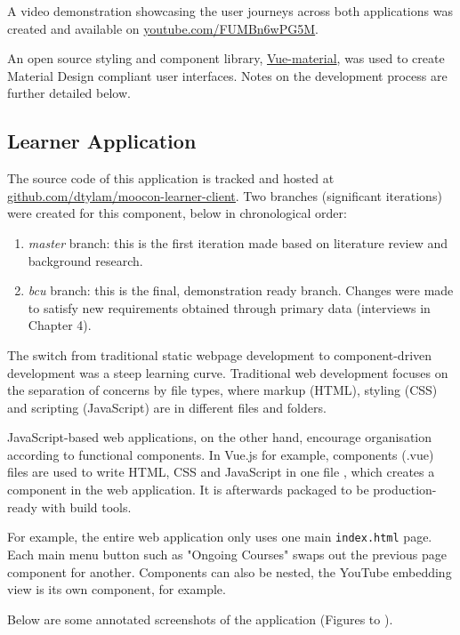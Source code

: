 A video demonstration showcasing the user journeys across both applications was created and 
available on \href{https://youtu.be/FUMBn6wPG5M}{\underline{youtube.com/FUMBn6wPG5M}}.

An open source styling and component library, \href{https://vuematerial.io/}{Vue-material}, was used to 
create Material Design compliant user interfaces. Notes on the development process are further detailed below.

\subsection{Learner Application}

The source code of this application is tracked and hosted at 
\href{https://github.com/dtylam/moocon-learner-client}{\underline{github.com/dtylam/moocon-learner-client}}.
Two branches (significant iterations) were created for this component, below in chronological order:
\begin{enumerate}
	\setlength\itemsep{0em}
	\item \textit{master} branch: this is the first iteration made based on literature review and background research.
	\item \textit{bcu} branch: this is the final, demonstration ready branch. 
	Changes were made to satisfy new requirements obtained through primary data (interviews in Chapter 4).
\end{enumerate}

The switch from traditional static webpage development to component-driven development was a steep learning curve.
Traditional web development focuses on the separation of concerns by file types, where markup (HTML), 
styling (CSS) and scripting (JavaScript) are in different files and folders.

JavaScript-based web applications, on the other hand, encourage organisation according to functional components. 
In Vue.js for example, components (.vue) files are used to write HTML, CSS and JavaScript in one file \citep{vue2017components}, 
which creates a component in the web application. It is afterwards packaged to be production-ready with build tools.

For example, the entire web application only uses one main \texttt{index.html} page. Each main menu button 
such as "Ongoing Courses" swaps out the previous page component for another. Components can also be nested, 
the YouTube embedding view is its own component, for example.

Below are some annotated screenshots of the application (Figures to ).

